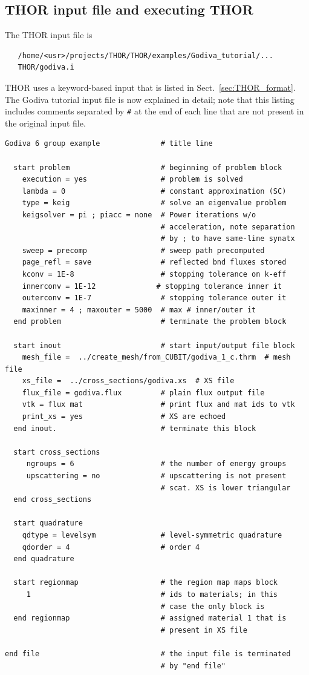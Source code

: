 \subsection{THOR input file and executing THOR}
The THOR input file is
\begin{verbatim}
   /home/<usr>/projects/THOR/THOR/examples/Godiva_tutorial/...
   THOR/godiva.i 
\end{verbatim}
THOR uses a keyword-based input that is listed in Sect.~\ref{sec:THOR_format}. The Godiva tutorial input file is now explained in detail; note that this listing includes comments separated by \verb"#" at the end of each line that are not present in the original input file.
\begin{verbatim}
Godiva 6 group example              # title line    

  start problem                     # beginning of problem block
    execution = yes                 # problem is solved
    lambda = 0                      # constant approximation (SC)
    type = keig                     # solve an eigenvalue problem
    keigsolver = pi ; piacc = none  # Power iterations w/o 
                                    # acceleration, note separation 
                                    # by ; to have same-line synatx
    sweep = precomp                 # sweep path precomputed  
    page_refl = save                # reflected bnd fluxes stored
    kconv = 1E-8                    # stopping tolerance on k-eff
    innerconv = 1E-12              # stopping tolerance inner it
    outerconv = 1E-7                # stopping tolerance outer it
    maxinner = 4 ; maxouter = 5000  # max # inner/outer it 
  end problem                       # terminate the problem block 

  start inout                       # start input/output file block
    mesh_file =  ../create_mesh/from_CUBIT/godiva_1_c.thrm  # mesh file
    xs_file =  ../cross_sections/godiva.xs  # XS file
    flux_file = godiva.flux         # plain flux output file 
    vtk = flux mat                  # print flux and mat ids to vtk
    print_xs = yes                  # XS are echoed
  end inout.                        # terminate this block

  start cross_sections
     ngroups = 6                    # the number of energy groups
     upscattering = no              # upscattering is not present
                                    # scat. XS is lower triangular
  end cross_sections

  start quadrature
    qdtype = levelsym               # level-symmetric quadrature
    qdorder = 4                     # order 4
  end quadrature

  start regionmap                   # the region map maps block
     1                              # ids to materials; in this 
                                    # case the only block is 
  end regionmap                     # assigned material 1 that is
                                    # present in XS file

end file                            # the input file is terminated 
                                    # by "end file"
\end{verbatim}

